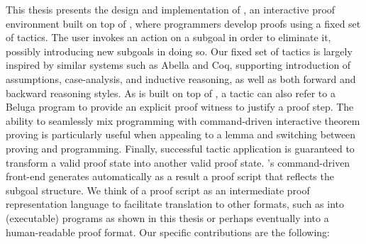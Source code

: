 This thesis presents the design and implementation of \Harpoon, an
interactive proof environment built on top of \Beluga, where programmers develop
proofs using a fixed set of tactics.
The user invokes an action on a subgoal in order to eliminate it, possibly
introducing new subgoals in doing so.
Our fixed set of tactics is largely inspired by similar systems such as
Abella \cite{Gacek:IJCAR08} and Coq, supporting introduction of assumptions,
case-analysis, and inductive reasoning, as well as both forward and backward
reasoning styles.
As \Harpoon{} is built on top of \Beluga{}, a tactic can also refer to a
Beluga{} program to provide an explicit proof witness to justify a proof step.
The ability to seamlessly mix programming with command-driven interactive
theorem proving is particularly useful when appealing to a lemma and switching
between proving and programming.
Finally, successful tactic application is guaranteed to transform a valid proof
state into another valid proof state.
%
\Harpoon's command-driven front-end generates automatically as a result a proof
script that reflects the subgoal structure.
We think of a proof script as an intermediate proof representation language to
facilitate translation to other formats, such as into (executable) \Beluga{}
programs as shown in this thesis or perhaps eventually into a human-readable
proof format. Our specific contributions are the following:

